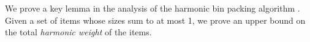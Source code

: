 We prove a key lemma in the analysis of the harmonic bin packing algorithm
\texorpdfstring{\cite{lee1985simple}}{[Lee and Lee, JACM 1985]}.
Given a set of items whose sizes sum to at most 1,
we prove an upper bound on the total \emph{harmonic weight} of the items.
